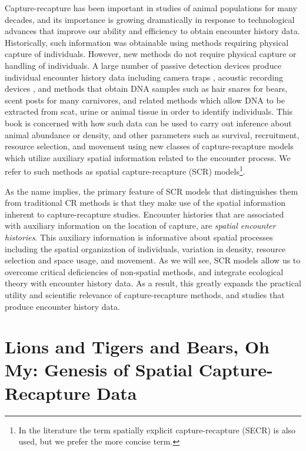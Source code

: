 Capture-recapture has been important in studies of animal
populations for many decades, and its importance is growing
dramatically in response to technological advances that improve our
ability and efficiency to obtain encounter history data. Historically,
such information was obtainable using methods requiring physical
capture of individuals.  However, new methods do not require physical
capture or handling of individuals.  A large number of passive
detection devices produce individual encounter history data including
camera traps \citep{karanth_nichols:1998, oconnell_etal:2010},
acoustic recording devices \citep{dawson_efford:2009}, and methods
that obtain DNA samples such as hair snares for bears, scent posts for
many carnivores, and related methods which allow DNA to be extracted
from scat, urine or animal tissue in order to identify individuals.
This book is concerned with how such data can be used to carry out
inference about animal abundance or density, and other parameters such
as survival, recruitment, resource selection, and movement using new
classes of capture-recapture models which utilize auxiliary spatial
information related to the encounter process.  We refer to such
methods as spatial capture-recapture (SCR) models\footnote{In the
  literature the term spatially explicit capture-recapture (SECR) is
  also used, but we prefer the more concise term.}.

As the name implies, the primary feature of SCR models that
distinguishes them from traditional CR methods is that they make use
of the spatial information inherent to capture-recapture studies.
Encounter histories that are associated with auxiliary information on
the location of capture, are {\it spatial encounter histories}. This
auxiliary information is informative about spatial processes including
the spatial organization of individuals, variation in density,
resource selection and space usage, and movement.  As we will see, SCR
models allow us to overcome critical deficiencies of non-spatial
methods, and integrate ecological theory with encounter history
data. As a result, this greatly expands the practical utility and
scientific relevance of capture-recapture methods, and studies that
produce encounter history data.



\section{Lions and Tigers and Bears, Oh My:
Genesis of Spatial Capture-Recapture Data}

